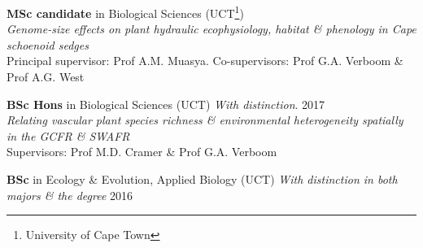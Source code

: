 \begin{hangparas}{2em}{1}

\textbf{MSc candidate} in Biological Sciences {\small
  (UCT\footnote{University of Cape Town})}                                \\
\hspace{2em} \textit{Genome-size effects on plant
  hydraulic ecophysiology, habitat \& phenology in
  Cape schoenoid sedges}                                                  \\
\hspace{2em} Principal supervisor: Prof A.M. Muasya.
  Co-supervisors:
  Prof G.A. Verboom \&
  Prof A.G. West

\textbf{BSc Hons} in Biological Sciences {\small
  (UCT) \textit{With distinction}}.                  \hfill {\small 2017} \\
\hspace{2em} \textit{Relating vascular plant species
  richness \& environmental heterogeneity spatially
  in the GCFR \& SWAFR}                                                   \\
\hspace{2em} Supervisors:
  Prof M.D. Cramer \&
  Prof G.A. Verboom

\textbf{BSc} in Ecology \& Evolution, Applied
  Biology {\small (UCT) \textit{With distinction in
  both majors \& the degree}}                        \hfill {\small 2016}

\end{hangparas}
